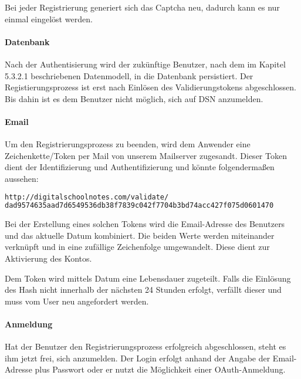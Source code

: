 Bei jeder Registrierung generiert sich das Captcha neu, dadurch kann es nur einmal eingelöst werden.


\newpage

\paragraph{Datenbank}
Nach der Authentisierung wird der zukünftige Benutzer, nach dem im Kapitel 5.3.2.1 beschriebenen Datenmodell, in die Datenbank persistiert. Der Registierungsprozess ist erst nach Einlösen des Validierungstokens abgeschlossen. Bis dahin ist es dem Benutzer nicht möglich, sich auf DSN anzumelden.

\paragraph{Email}
Um den Registrierungsprozess zu beenden, wird dem Anwender eine Zeichenkette/Token per Mail von unserem Mailserver zugesandt. Dieser Token dient der Identifizierung und Authentifizierung und könnte folgendermaßen aussehen:
\begin{lstlisting}[caption={Validierungstoken für die Aktivierung des DSN-Accounts}, language=bash]
http://digitalschoolnotes.com/validate/
dad9574635aad7d6549536db38f7839c042f7704b3bd74acc427f075d0601470
\end{lstlisting}
Bei der Erstellung eines solchen Tokens wird die Email-Adresse des Benutzers und das aktuelle Datum kombiniert. Die beiden Werte werden miteinander verknüpft und in eine zufällige Zeichenfolge umgewandelt. Diese dient zur Aktivierung des Kontos.

Dem Token wird mittels Datum eine Lebensdauer zugeteilt. Falls die Einlösung des Hash nicht innerhalb der nächsten 24 Stunden erfolgt, verfällt dieser und muss vom User neu angefordert werden. 

\paragraph{Anmeldung}
Hat der Benutzer den Registrierungsprozess erfolgreich abgeschlossen, steht es ihm jetzt frei, sich anzumelden. Der Login erfolgt anhand der Angabe der Email-Adresse plus Passwort oder er nutzt die Möglichkeit einer \gls{OAuth}-Anmeldung.

